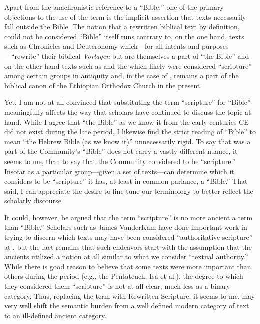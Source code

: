 Apart from the anachronistic reference to a ``Bible,'' one of the
primary objections to the use of the term \rwb is the
implicit assertion that \rwb texts necessarily fall
outside the Bible.\autocite[61]{campbell_zsengeller2014} The notion that
a rewritten biblical text by definition, could not be considered
``Bible'' itself runs contrary to, on the one hand, texts such as
Chronicles and Deuteronomy which---for all intents and
purposes---``rewrite'' their biblical \emph{Vorlagen} but are themselves
a part of ``the Bible'' and on the other hand texts such as
\jub and the \templescroll which likely
were considered ``scripture'' among certain groups in antiquity and, in
the case of \jub, remains a part of the biblical canon
of the Ethiopian Orthodox Church in the present.

Yet, I am not at all convinced that substituting the term ``scripture''
for ``Bible'' meaningfully affects the way that scholars have continued
to discuss the topic at hand. While I agree that ``the Bible'' as we
know it from the early centuries CE did not exist during the late
\secondtemple period, I likewise find the strict reading of
``Bible'' to mean ``the Hebrew Bible (as we know it)'' unnecessarily
rigid. To say that \jub was a part of the
\qumran Community's ``Bible'' does not carry a vastly
different nuance, it seems to me, than to say that the
\qumran Community considered \jub to be
``scripture.'' Insofar as a particular group---given a set of
texts---can determine which it considers to be ``scripture'' it has, at
least in common parlance, a ``Bible.'' That said, I can appreciate the
desire to fine-tune our terminology to better reflect the scholarly
discourse.

It could, however, be argued that the term ``scripture'' is no more
ancient a term than ``Bible.'' Scholars such as James VanderKam have
done important work in trying to discern which texts may have been
considered ``authoritative scripture'' at
\qumran,\autocite{vanderkam_dsd1998} but the fact
remains that such endeavors start with the assumption that the ancients
utilized a notion at all similar to what we consider ``textual
authority.'' While there is good reason to believe that some texts were
more important than others during the \secondtemple period (e.g.,
the Pentateuch, Isa et al.), the degree to which they considered them
``scripture'' is not at all clear, much less as a binary category. Thus,
replacing the term \rwb with Rewritten Scripture, it
seems to me, may very well shift the semantic burden from a well defined
modern category of text to an ill-defined ancient category.

